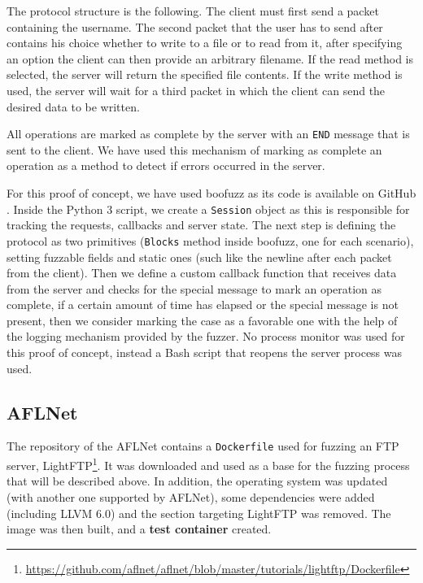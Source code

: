 \documentclass[10pt,a4paper,english,onecolumn]{IEEEtran}
\begin{document}
The protocol structure is the following. The client must first send a packet containing the username. The second packet that the user has to send after contains his choice whether to write to a file or to read from it, after specifying an option the client can then provide an arbitrary filename. If the read method is selected, the server will return the specified file contents. If the write method is used, the server will wait for a third packet in which the client can send the desired data to be written. 

All operations are marked as complete by the server with an \texttt{END} message that is sent to the client. We have used this mechanism of marking as complete an operation as a method to detect if errors occurred in the server.

For this proof of concept, we have used boofuzz as its code is available on GitHub \cite{boofuzz_repo}. Inside the Python 3 script, we create a \texttt{Session} object as this is responsible for tracking the requests, callbacks and server state. The next step is defining the protocol as two primitives (\texttt{Blocks} method inside boofuzz, one for each scenario), setting fuzzable fields and static ones (such like the newline after each packet from the client). Then we define a custom callback function that receives data from the server and checks for the special message to mark an operation as complete, if a certain amount of time has elapsed or the special message is not present, then we consider marking the case as a favorable one with the help of the logging mechanism provided by the fuzzer. No process monitor was used for this proof of concept, instead a Bash script that reopens the server process was used.

\subsection{AFLNet}

The repository of the AFLNet contains a \texttt{Dockerfile} used for fuzzing an FTP server, LightFTP\footnote{\href{https://github.com/aflnet/aflnet/blob/master/tutorials/lightftp/Dockerfile}{https://github.com/aflnet/aflnet/blob/master/tutorials/lightftp/Dockerfile}}. It was downloaded and used as a base for the fuzzing process that will be described above. In addition, the operating system was updated (with another one supported by AFLNet), some dependencies were added (including LLVM 6.0) and the section targeting LightFTP was removed. The image was then built, and a \textbf{test container} created.
\end{document}
